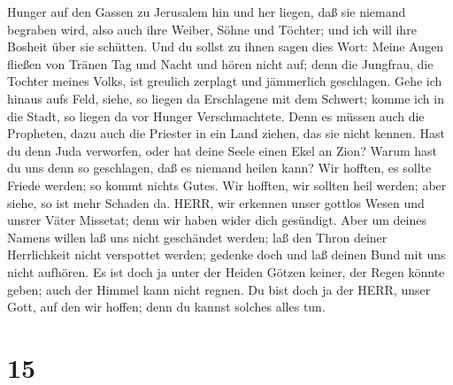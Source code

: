 Hunger auf den Gassen zu Jerusalem hin und her liegen, daß sie niemand
begraben wird, also auch ihre Weiber, Söhne und Töchter; und ich will
ihre Bosheit über sie schütten.  Und du sollst zu ihnen
sagen dies Wort: Meine Augen fließen von Tränen Tag und Nacht und hören
nicht auf; denn die Jungfrau, die Tochter meines Volks, ist greulich
zerplagt und jämmerlich geschlagen.  Gehe ich hinaus aufs
Feld, siehe, so liegen da Erschlagene mit dem Schwert; komme ich in die
Stadt, so liegen da vor Hunger Verschmachtete. Denn es müssen auch die
Propheten, dazu auch die Priester in ein Land ziehen, das sie nicht
kennen.  Hast du denn Juda verworfen, oder hat deine Seele
einen Ekel an Zion? Warum hast du uns denn so geschlagen, daß es niemand
heilen kann? Wir hofften, es sollte Friede werden; so kommt nichts
Gutes. Wir hofften, wir sollten heil werden; aber siehe, so ist mehr
Schaden da.  HERR, wir erkennen unser gottlos Wesen und
unsrer Väter Missetat; denn wir haben wider dich gesündigt.
 Aber um deines Namens willen laß uns nicht geschändet
werden; laß den Thron deiner Herrlichkeit nicht verspottet werden;
gedenke doch und laß deinen Bund mit uns nicht aufhören. 
Es ist doch ja unter der Heiden Götzen keiner, der Regen könnte geben;
auch der Himmel kann nicht regnen. Du bist doch ja der HERR, unser Gott,
auf den wir hoffen; denn du kannst solches alles tun.

\hypertarget{section-14}{%
\section{15}\label{section-14}}

